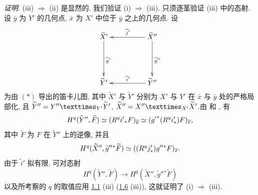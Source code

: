 \noindent
\emph{证明}. (iii) $\Rightarrow$ (ii) 是显然的. 我们验证 (i) $\Rightarrow$ (iii). 只须逐茎验证 (iii) 中的态射. 设 $\bar{y}$ 为 $Y'$ 的几何点, $\bar{x}$ 为 $X'$ 中位于 $\bar{y}$ 之上的几何点. 设
$$
\xymatrix@=1.75cm{
\widetilde{X}'   \ar[d]^{\widetilde{g}'}& \widetilde{X}''
\ar[l]_{\widetilde{j}'} \ar[d]^{\widetilde{g}''}\\
 \widetilde{Y}'           & \widetilde{Y}'' \ar[l]_{\widetilde{i}'}
}
$$
为由 $({\ast})$ 导出的笛卡儿图, 其中 $\widetilde{X}'$ 与 $\widetilde{Y}'$ 分别为 $X'$ 与 $Y'$ 在 $\bar{x}$ 与 $\bar{y}$ 处的严格局部化, 且 $\widetilde{Y}''=\fprod{Y''}{\widetilde{Y}'}{Y'}$, $\widetilde{X}''=\fprod{X''}{\widetilde{X}'}{X'}$.\pageoriginale 由  和 , 有
$$
H^{q}(\widetilde{Y}'',\widetilde{F})\simeq
(R^{q}i'{}_{\ast}F)_{\overline{y}}\simeq
({g'}^{\ast}(R^{q}i'_{\ast})F)_{\overline{x}}{},
$$
其中 $\widetilde{F}$ 为 $F$ 在 $\widetilde{Y}''$ 上的逆像, 并且
$$
H^{q}(\widetilde{X}'',{\widetilde{g}''}{}^{\ast}\widetilde{F})\simeq
((R^{q}j'_{\ast}){g''}{}^{\ast}F)_{\overline{x}}{}.
$$
由于 $\widetilde{i}'$ 拟有限, 可对态射
$$
H^{q}(\widetilde{Y}'',\widetilde{F})\longrightarrow
H^{q}(\widetilde{X}'',{\widetilde{g}''}{}^{\ast}\widetilde{F})
$$
以及所考察的 $q$ 的取值应用 \hyperref[XV.prop1.1]{1.1} (iii) (\resp \hyperref[XV.prop1.6]{1.6} (iii)), 这就证明了 (i) $\Rightarrow$ (iii).

